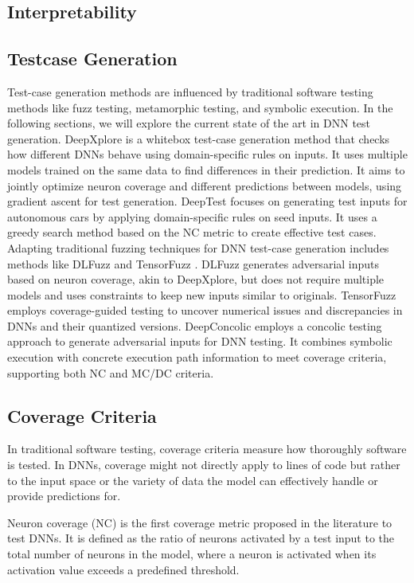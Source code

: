 \subsection{Interpretability}

\subsection{Testcase Generation}
Test-case generation methods are influenced by traditional software testing methods like fuzz testing, metamorphic testing, and symbolic execution. In the following sections, we will explore the current state of the art in DNN test generation. DeepXplore \cite{deepxplore} is a whitebox test-case generation method that checks how different DNNs behave using domain-specific rules on inputs. It uses multiple models trained on the same data to find differences in their prediction. It aims to jointly optimize neuron coverage and different predictions between models, using gradient ascent for test generation. DeepTest \cite{deeptest} focuses on generating test inputs for autonomous cars by applying domain-specific rules on seed inputs. It uses a greedy search method based on the NC metric to create effective test cases. Adapting traditional fuzzing techniques for DNN test-case generation includes methods like DLFuzz \cite{DLFuzz} and TensorFuzz \cite{tensorfuzz}. DLFuzz generates adversarial inputs based on neuron coverage, akin to DeepXplore, but does not require multiple models and uses constraints to keep new inputs similar to originals. TensorFuzz employs coverage-guided testing to uncover numerical issues and discrepancies in DNNs and their quantized versions. DeepConcolic \cite{Deepconcolic} employs a concolic testing approach to generate adversarial inputs for DNN testing. It combines symbolic execution with concrete execution path information to meet coverage criteria, supporting both NC and MC/DC criteria.


\subsection{Coverage Criteria}
In traditional software testing, coverage criteria measure how thoroughly software is tested. In DNNs, coverage might not directly apply to lines of code but rather to the input space or the variety of data the model can effectively handle or provide predictions for.

Neuron coverage (NC) \cite{deepxplore} is the first coverage metric proposed in the literature to test DNNs. It is defined as the ratio of neurons activated by a test input to the total number of neurons in the model, where a neuron is activated when its activation value exceeds a predefined threshold.


